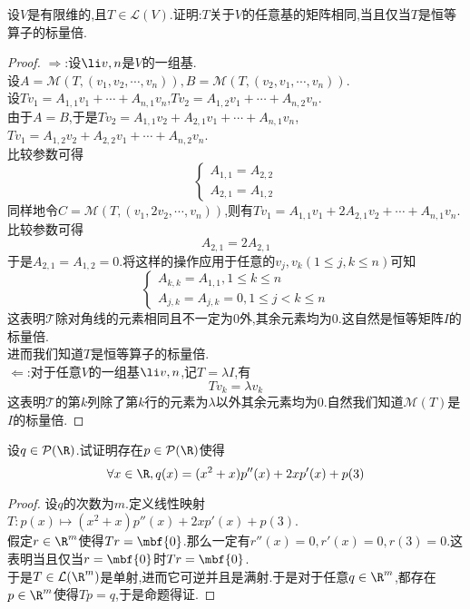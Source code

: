 \documentclass{ctexart}
\begin{document}
\begin{problem}[19.]
    设$V$是有限维的,且$T\in\mathcal{L}(V)$.证明:$T$关于$V$的任意基的矩阵相同,当且仅当$T$是恒等算子的标量倍.
\end{problem}
\begin{proof}
    $\Rightarrow$:设$\li v,n$是$V$的一组基.\\
    设$A=\mathcal{M}(T,(v_1,v_2,\cdots,v_n)),B=\mathcal{M}(T,(v_2,v_1,\cdots,v_n))$.\\
    设$Tv_1=A_{1,1}v_1+\cdots+A_{n,1}v_n$,$Tv_2=A_{1,2}v_1+\cdots+A_{n,2}v_n$.\\
    由于$A=B$,于是$Tv_2=A_{1,1}v_2+A_{2,1}v_1+\cdots+A_{n,1}v_n$,$Tv_1=A_{1,2}v_2+A_{2,2}v_1+\cdots+A_{n,2}v_n$.\\
    比较参数可得$$\left\{\begin{array}{l}
        A_{1,1}=A_{2,2} \\
        A_{2,1}=A_{1,2} 
    \end{array}\right.$$
    同样地令$C=\mathcal{M}(T,(v_1,2v_2,\cdots,v_n))$,则有$Tv_1=A_{1,1}v_1+2A_{2,1}v_2+\cdots+A_{n,1}v_n$.比较参数可得
    $$A_{2,1}=2A_{2,1}$$
    于是$A_{2,1}=A_{1,2}=0$.将这样的操作应用于任意的$v_j,v_k(1\leqslant j,k\leqslant n)$可知
    $$\left\{\begin{array}{l}
        A_{k,k}=A_{1,1},1\leqslant k\leqslant n\\
        A_{j,k}=A_{j,k}=0,1\leqslant j<k\leqslant n
    \end{array}\right.$$
    这表明$\mathcal{T}$除对角线的元素相同且不一定为$0$外,其余元素均为$0$.这自然是恒等矩阵$I$的标量倍.\\
    进而我们知道$T$是恒等算子的标量倍.\\
    $\Leftarrow$:对于任意$V$的一组基$\li v,n$,记$T=\lambda I$,有
    $$Tv_k=\lambda v_k$$
    这表明$\mathcal{T}$的第$k$列除了第$k$行的元素为$\lambda$以外其余元素均为$0$.自然我们知道$\mathcal{M}(T)$是$I$的标量倍.
\end{proof}
\begin{problem}[20.]
    设$q\in\mathcal{P}(\R)$.试证明存在$p\in\mathcal{P}(\R)$使得
    $$\forall x\in\R,q(x)=(x^2+x)p''(x)+2xp'(x)+p(3)$$
\end{problem}
\begin{proof}
    设$q$的次数为$m$.定义线性映射$T:p(x)\mapsto (x^2+x)p''(x)+2xp'(x)+p(3)$.\\
    假定$r\in\R^m$使得$Tr=\mbf{0}$.那么一定有$r''(x)=0,r'(x)=0,r(3)=0$.这表明当且仅当$r=\mbf{0}$时$Tr=\mbf{0}$.\\
    于是$T\in\mathcal{L}(\R^m)$是单射,进而它可逆并且是满射.于是对于任意$q\in\R^m$,都存在$p\in\R^m$使得$Tp=q$,于是命题得证.
\end{proof}
\end{document}
